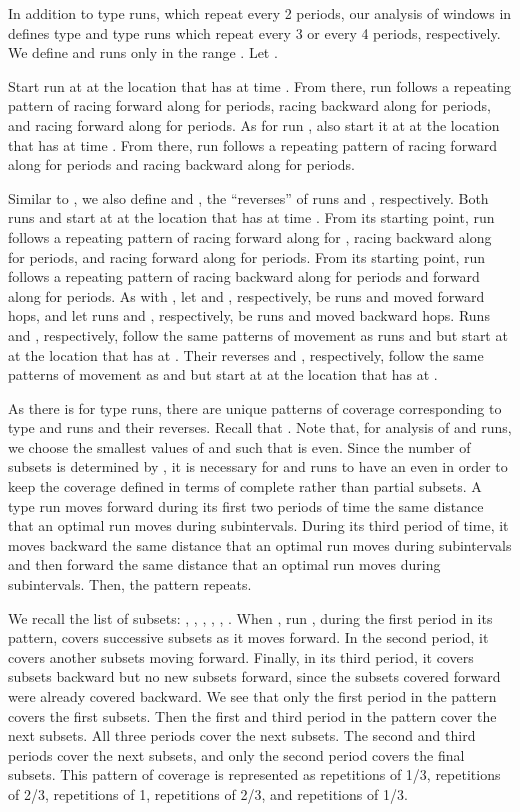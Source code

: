 \documentclass[11pt]{article}
\begin{document}
In addition to type  runs, which repeat every 2 periods, our analysis of windows in  defines type  and type  runs which repeat every 3 or every 4 periods, respectively.  We define  and  runs only in the range .  Let .

Start run  at  at the location that  has at time .  From there, run  follows a repeating pattern of racing forward along  for  periods, racing backward along  for  periods, and racing forward along  for  periods.  As for run , also start it at  at the location that  has at time .  From there, run  follows a repeating pattern of racing forward along  for  periods and racing backward along  for  periods.

Similar to , we also define  and , the ``reverses'' of runs  and , respectively.  Both runs  and  start at  at the location that  has at time .  From its starting point, run  follows a repeating pattern of racing forward along  for , racing backward along  for  periods, and racing forward along  for  periods.  From its starting point, run  follows a repeating pattern of racing backward along  for  periods and forward along  for  periods.  As with , let  and , respectively, be runs  and  moved forward  hops, and let runs  and , respectively, be runs  and  moved backward  hops.  Runs  and , respectively, follow the same patterns of movement as runs  and  but start at  at the location that  has at  .  Their reverses  and , respectively, follow the same patterns of movement as  and  but start at  at the location that  has at .

As there is for type  runs, there are unique patterns of coverage corresponding to type  and  runs and their reverses.   Recall that .  Note that, for analysis of  and  runs, we choose the smallest values of  and  such that  is even.  Since the number of subsets is determined by , it is necessary for  and  runs to have an even  in order to keep the coverage defined in terms of complete rather than partial subsets.  A type  run moves forward during its first two periods of time the same distance that an optimal run moves during  subintervals.  During its third period of time, it moves backward the same distance that an optimal run moves during  subintervals and then forward the same distance that an optimal run moves during  subintervals.  Then, the pattern repeats.

We recall the list of subsets: ,   ,   ,   ,   ,   .
When , run , during the first period in its pattern, covers  successive subsets as it moves forward.  In the second period, it covers another  subsets moving forward.  Finally, in its third period, it covers  subsets backward but no new subsets forward, since the subsets covered forward were already covered backward.    We see that only the first period in the pattern covers the first  subsets.  Then the first and third period in the pattern cover the next  subsets.  All three periods cover the next  subsets.  The second and third periods cover the next  subsets, and only the second period covers the final  subsets.  This pattern of coverage is represented as  repetitions of 1/3,  repetitions of 2/3,  repetitions of 1,  repetitions of 2/3, and  repetitions of 1/3.
\end{document}
